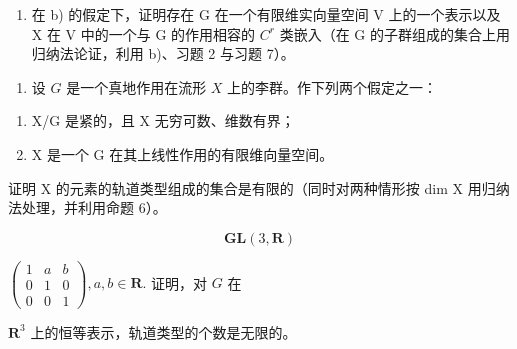 \begin{enumerate}
\begin{enumerate}
\def\labelenumi{\alph{enumi})}
\setcounter{enumi}{2}
\tightlist
\item
  在 b) 的假定下，证明存在 G 在一个有限维实向量空间 V 上的一个表示以及 X 在 V 中的一个与 G 的作用相容的 \(C^{r}\) 类嵌入（在 G 的子群组成的集合上用归纳法论证，利用 b)、习题 2 与习题 7）。
\end{enumerate}

\begin{enumerate}
\def\labelenumi{\arabic{enumi})}
\setcounter{enumi}{8}
\tightlist
\item
  设 \(G\) 是一个真地作用在流形 \(X\) 上的李群。作下列两个假定之一：
\end{enumerate}

\begin{enumerate}
\def\labelenumi{(\roman{enumi})}
\tightlist
\item
  X/G 是紧的，且 X 无穷可数、维数有界；\\
\item
  X 是一个 G 在其上线性作用的有限维向量空间。
\end{enumerate}

证明 X 的元素的轨道类型组成的集合是有限的（同时对两种情形按 dim X 用归纳法处理，并利用命题 6）。

\[
\mathbf {G L} (3, \mathbf {R})
\]

\(\left(\begin{array}{ccc}1 & a & b \\ 0 & 1 & 0 \\ 0 & 0 & 1\end{array}\right), a, b \in \mathbf{R}.\) 证明，对 \(G\) 在

\(\mathbf{R}^3\) 上的恒等表示，轨道类型的个数是无限的。

\end{enumerate}
